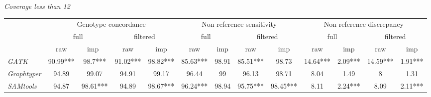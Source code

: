 \documentclass[../main.tex]{subfiles}
\begin{document}
\begin{flushleft}
\begin{landscape}
    \centering
    \emph{Coverage less than 12} \\
    \begin{footnotesize}
    \begin{tabular}{|l|c|c|c|c|c|c|c|c|c|c|c|c|} 
    \cline{2-13}
    \multicolumn{1}{c|}{\multirow{3}{*}{}} & \multicolumn{4}{c|}{Genotype concordance}                 & \multicolumn{4}{c|}{Non-reference sensitivity}            & \multicolumn{4}{c|}{Non-reference discrepancy}             \\ 
    \cline{2-13}
    \multicolumn{1}{c|}{}                  & \multicolumn{2}{c|}{full} & \multicolumn{2}{c|}{filtered} & \multicolumn{2}{c|}{full} & \multicolumn{2}{c|}{filtered} & \multicolumn{2}{c|}{full} & \multicolumn{2}{c|}{filtered}  \\ 
    \cline{2-13}
    \multicolumn{1}{c|}{}                  & raw      & imp~           & raw      & imp                & raw      & imp            & raw      & imp                & raw      & imp            & raw      & imp                 \\ 
    \arrayrulecolor{black}\cline{1-1}\arrayrulecolor{black}\cline{2-13}
    \emph{GATK}                                   & 90.99*** & 98.7***        & 91.02*** & 98.82***           & 85.63*** & 98.91          & 85.51*** & 98.73              & 14.64*** & 2.09***        & 14.59*** & 1.91***             \\ 
    \hline
    \emph{Graphtyper}                             & 94.89    & 99.07          & 94.91    & 99.17              & 96.44    & 99             & 96.13    & 98.71              & 8.04     & 1.49           & 8        & 1.31                \\ 
    \hline
    \emph{SAMtools}                               & 94.87    & 98.61***       & 94.89    & 98.67***           & 96.24*** & 98.94          & 95.75*** & 98.45***           & 8.11     & 2.24***        & 8.09     & 2.11***             \\
    \hline
    \end{tabular}
    \end{footnotesize}


\bigskip
\bigskip


\end{landscape}
\end{flushleft}
\end{document}
